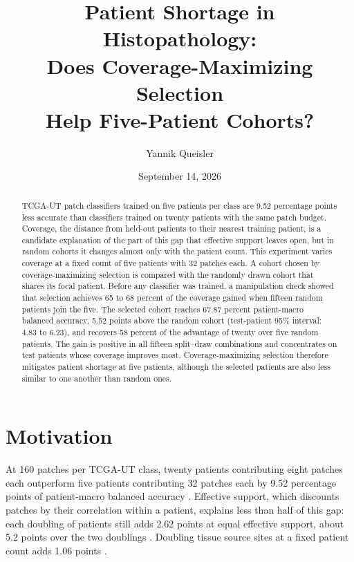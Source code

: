 \documentclass[11pt]{article}
\title{Patient Shortage in Histopathology:\\Does Coverage-Maximizing Selection\\Help Five-Patient Cohorts?}
\author{Yannik Queisler}
\date{September 14, 2026}
\begin{document}
\raggedbottom
{}
\setlength{\emergencystretch}{2em}
\maketitle
\begin{abstract}
\noindent TCGA-UT patch classifiers trained on five patients per class are 9.52 percentage points less accurate than classifiers trained on twenty patients with the same patch budget. Coverage, the distance from held-out patients to their nearest training patient, is a candidate explanation of the part of this gap that effective support leaves open, but in random cohorts it changes almost only with the patient count. This experiment varies coverage at a fixed count of five patients with 32 patches each. A cohort chosen by coverage-maximizing selection is compared with the randomly drawn cohort that shares its focal patient. Before any classifier was trained, a manipulation check showed that selection achieves 65 to 68 percent of the coverage gained when fifteen random patients join the five. The selected cohort reaches 67.87 percent patient-macro balanced accuracy, 5.52 points above the random cohort (test-patient 95\% interval: 4.83 to 6.23), and recovers 58 percent of the advantage of twenty over five random patients. The gain is positive in all fifteen split--draw combinations and concentrates on test patients whose coverage improves most. Coverage-maximizing selection therefore mitigates patient shortage at five patients, although the selected patients are also less similar to one another than random ones.
\end{abstract}
\setcounter{tocdepth}{1}
\tableofcontents
\clearpage

\section{Motivation}
\label{sec:motivation}
At 160 patches per TCGA-UT class, twenty patients contributing eight patches each outperform five patients contributing 32 patches each by 9.52 percentage points of patient-macro balanced accuracy \citep{queisler2026effectiveSupport}. Effective support, which discounts patches by their correlation within a patient, explains less than half of this gap: each doubling of patients still adds 2.62 points at equal effective support, about 5.2 points over the two doublings \citep{queisler2026multidirectionalRedundancy}. Doubling tissue source sites at a fixed patient count adds 1.06 points \citep{queisler2026siteCoverage}.
\end{document}
